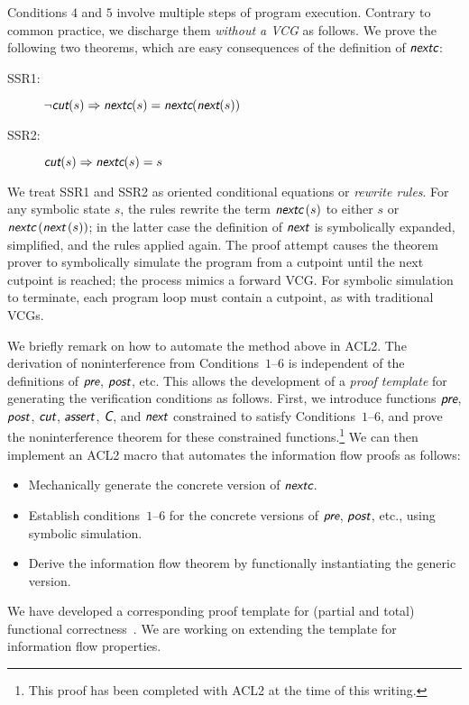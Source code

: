 \documentclass[conference]{IEEEtran}
\newcommand{\func}[1]{\ensuremath{\mbox{{\sf {\em #1}}}}}
\begin{document}
Conditions $4$ and $5$ involve multiple steps of program execution.
Contrary to common practice, we discharge them {\em without a VCG} as
follows.  We prove the following two theorems, which are easy
consequences of the definition of \func{nextc}:
\begin{description}
\item[SSR1:] 
$\neg\func{cut}(s)\Rightarrow\func{nextc}(s)=\func{nextc}(\func{next}(s))$
\item[SSR2:] $\func{cut}(s)\Rightarrow\func{nextc}(s)=s$
\end{description}
We treat SSR1 and SSR2 as oriented conditional equations or {\em
rewrite rules}.  For any symbolic state $s$, the rules rewrite the
term $\func{nextc}\,(s)$ to either $s$ or
$\func{nextc}\,(\func{next}\,(s))$; in the latter case the definition
of \func{next} is symbolically expanded, simplified, and the rules
applied again.  The proof attempt causes the theorem prover to
symbolically simulate the program from a cutpoint until the next
cutpoint is reached; the process mimics a forward VCG.  For symbolic
simulation to terminate, each program loop must contain a cutpoint, as
with traditional VCGs.

We briefly remark on how to automate the method above in ACL2.  The
derivation of noninterference from Conditions~$1$--$6$ is independent
of the definitions of \func{pre}, \func{post}, etc.  This allows the
development of a {\em proof template} for generating the verification
conditions as follows.  First, we introduce functions \func{pre},
\func{post}, \func{cut}, \func{assert}, \func{C}, and \func{next}
constrained to satisfy Conditions~$1$--$6$, and prove the
noninterference theorem for these constrained functions.\footnote{This
proof has been completed with ACL2 at the time of this writing.}  We
can then implement an ACL2 macro that automates the information flow
proofs as follows:
\begin{itemize}
\item Mechanically generate the concrete version of \func{nextc}.
\item Establish conditions~$1$--$6$ for the concrete versions of \func{pre},
\func{post}, etc., using symbolic
simulation.
\item Derive the information flow theorem by functionally
instantiating the generic version.
\end{itemize}
We have developed a corresponding proof template for (partial and
total) functional correctness~\cite{symbolic}.  We are working on
extending the template for information flow properties.  
\end{document}
